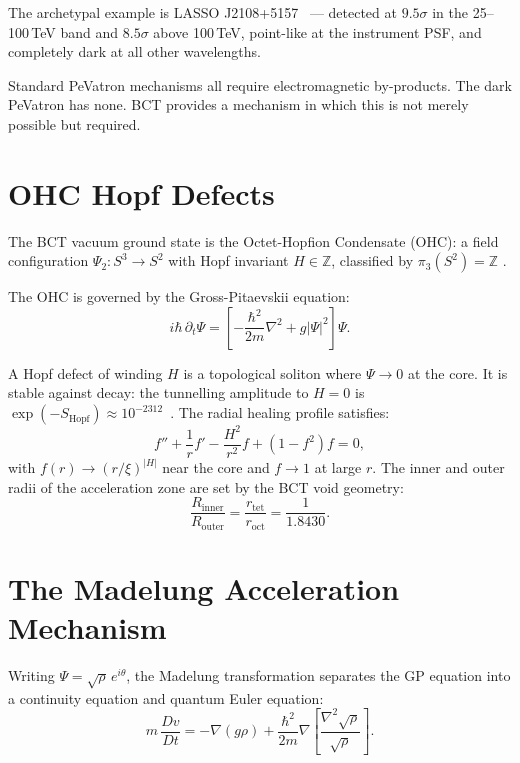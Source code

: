 \documentclass[twocolumn,prl,showpacs,preprintnumbers,amsmath,amssymb]{revtex4-1}
\begin{document}
The archetypal example is LASSO J2108+5157~\cite{LHAASO22} --- detected
at $9.5\sigma$ in the 25--100\,TeV band and $8.5\sigma$ above 100\,TeV,
point-like at the instrument PSF, and completely dark at all other
wavelengths.

Standard PeVatron mechanisms all require electromagnetic by-products.
The dark PeVatron has none. BCT provides a mechanism in which this is
not merely possible but required.

\section{OHC Hopf Defects}

The BCT vacuum ground state is the Octet-Hopfion Condensate (OHC):
a field configuration $\Psi_2: S^3 \to S^2$ with Hopf invariant
$H\in\mathbb{Z}$, classified by $\pi_3(S^2)=\mathbb{Z}$
\cite{BCT_L45,BCT_JH}.

The OHC is governed by the Gross-Pitaevskii equation:
\begin{equation}
i\hbar\,\partial_t\Psi = \left[-\frac{\hbar^2}{2m}\nabla^2 + g|\Psi|^2\right]\Psi.
\end{equation}

A Hopf defect of winding $H$ is a topological soliton where $\Psi\to 0$
at the core. It is stable against decay: the tunnelling amplitude to
$H=0$ is $\exp(-S_\mathrm{Hopf})\approx 10^{-2312}$~\cite{BCT_L45}.
The radial healing profile satisfies:
\begin{equation}
f'' + \frac{1}{r}f' - \frac{H^2}{r^2}f + (1-f^2)f = 0,
\end{equation}
with $f(r)\to(r/\xi)^{|H|}$ near the core and $f\to 1$ at large $r$.
The inner and outer radii of the acceleration zone are set by the
BCT void geometry:
\begin{equation}
\frac{R_\mathrm{inner}}{R_\mathrm{outer}} = \frac{r_\mathrm{tet}}{r_\mathrm{oct}}
= \frac{1}{1.8430}.
\end{equation}

\section{The Madelung Acceleration Mechanism}

Writing $\Psi = \sqrt{\rho}\,e^{i\theta}$, the Madelung transformation
separates the GP equation into a continuity equation and quantum Euler
equation:
\begin{equation}
m\,\frac{Dv}{Dt} = -\nabla(g\rho) +
\frac{\hbar^2}{2m}\nabla\!\left[\frac{\nabla^2\!\sqrt{\rho}}{\sqrt{\rho}}\right].
\end{equation}
\end{document}
